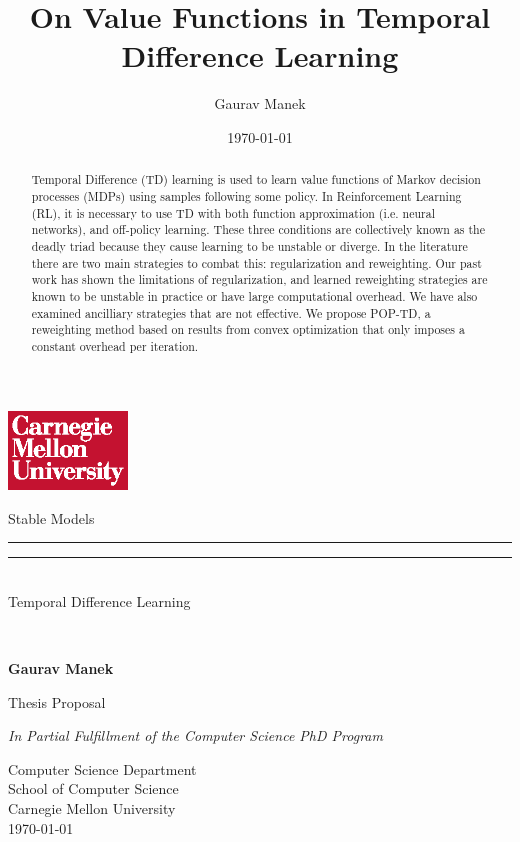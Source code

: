 \documentclass[11pt]{article}
\title{ On Value Functions in Temporal Difference Learning }
\author{ Gaurav Manek }
\date{\today}
\begin{document}
\begin{titlepage}
    {
        \hfill\includegraphics[width=1.25in,trim=0 0 .125in .25in]{cmu/cmu-wordmark-square-w-on-r}
    }
    \begin{center}{\SourceSerifPro
        \vfill

        {\Huge\OpenSans
            {
                {Stable Models}\\[-1.em]
                \rule{0.25\textwidth}{1pt}
                \rule{0.25\textwidth}{1pt}\\[.5em]
                {Temporal Difference Learning}
            }
        }\\


        \vspace{0.25in}

        \textbf{\large Gaurav Manek}\\

        \vfill

        Thesis Proposal

        \textit{In Partial Fulfillment of the Computer Science PhD Program}

        \vspace{0.33in}
        Computer Science Department\\
        School of Computer Science\\
        Carnegie Mellon University\\
        \today

    }\end{center}
\end{titlepage}

\cleardoublepage

~\vfill
\begin{center}
    \begin{minipage}[c]{.7\textwidth}
        \begin{abstract}
            Temporal Difference (TD) learning is used to learn value functions of Markov decision processes (MDPs) using samples following some policy. In Reinforcement Learning (RL), it is necessary to use TD with both function approximation (i.e. neural networks), and off-policy learning. These three conditions are collectively known as the deadly triad because they cause learning to be unstable or diverge. In the literature there are two main strategies to combat this: regularization and reweighting. Our past work has shown the limitations of regularization, and learned reweighting strategies are known to be unstable in practice or have large computational overhead. We have also examined ancilliary strategies that are not effective. We propose POP-TD, a reweighting method based on results from convex optimization that only imposes a constant overhead per iteration.
        \end{abstract}
    \end{minipage}
\end{center}
\end{document}
